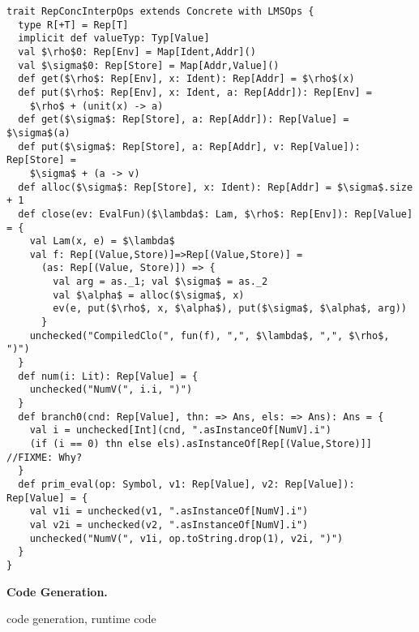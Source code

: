 \begin{lstlisting}
trait RepConcInterpOps extends Concrete with LMSOps {
  type R[+T] = Rep[T]
  implicit def valueTyp: Typ[Value]
  val $\rho$0: Rep[Env] = Map[Ident,Addr]()
  val $\sigma$0: Rep[Store] = Map[Addr,Value]()
  def get($\rho$: Rep[Env], x: Ident): Rep[Addr] = $\rho$(x)
  def put($\rho$: Rep[Env], x: Ident, a: Rep[Addr]): Rep[Env] = 
    $\rho$ + (unit(x) -> a)
  def get($\sigma$: Rep[Store], a: Rep[Addr]): Rep[Value] = $\sigma$(a)
  def put($\sigma$: Rep[Store], a: Rep[Addr], v: Rep[Value]): Rep[Store] = 
    $\sigma$ + (a -> v)
  def alloc($\sigma$: Rep[Store], x: Ident): Rep[Addr] = $\sigma$.size + 1
  def close(ev: EvalFun)($\lambda$: Lam, $\rho$: Rep[Env]): Rep[Value] = {
    val Lam(x, e) = $\lambda$
    val f: Rep[(Value,Store)]=>Rep[(Value,Store)] = 
      (as: Rep[(Value, Store)]) => {
        val arg = as._1; val $\sigma$ = as._2
        val $\alpha$ = alloc($\sigma$, x)
        ev(e, put($\rho$, x, $\alpha$), put($\sigma$, $\alpha$, arg))
      }
    unchecked("CompiledClo(", fun(f), ",", $\lambda$, ",", $\rho$, ")")
  }
  def num(i: Lit): Rep[Value] = {
    unchecked("NumV(", i.i, ")")
  }
  def branch0(cnd: Rep[Value], thn: => Ans, els: => Ans): Ans = {
    val i = unchecked[Int](cnd, ".asInstanceOf[NumV].i")
    (if (i == 0) thn else els).asInstanceOf[Rep[(Value,Store)]] //FIXME: Why?
  }
  def prim_eval(op: Symbol, v1: Rep[Value], v2: Rep[Value]): Rep[Value] = {
    val v1i = unchecked(v1, ".asInstanceOf[NumV].i")
    val v2i = unchecked(v2, ".asInstanceOf[NumV].i")
    unchecked("NumV(", v1i, op.toString.drop(1), v2i, ")")
  }
}
\end{lstlisting}

\textbf{Code Generation.}

code generation, runtime code
